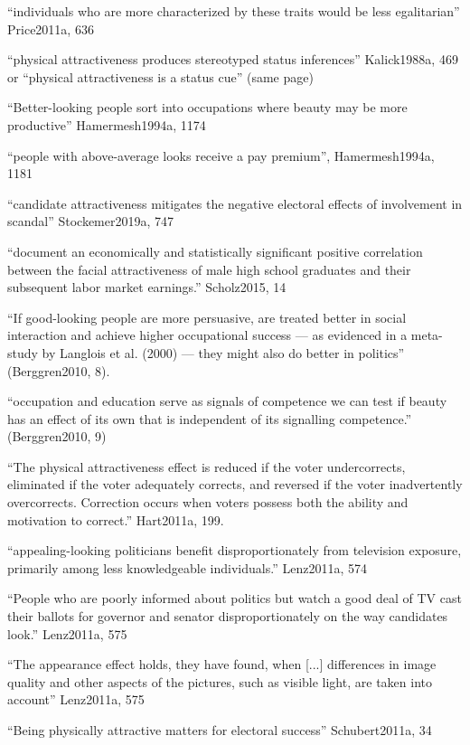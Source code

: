 ``individuals who are more characterized by these traits would be less egalitarian'' Price2011a, 636

``physical attractiveness produces stereotyped status inferences'' Kalick1988a, 469 or ``physical attractiveness is a status cue'' (same page)

``Better-looking people sort into occupations where beauty may be more productive'' Hamermesh1994a, 1174


		``people with above-average looks receive a pay premium'', Hamermesh1994a, 1181

		``candidate attractiveness mitigates the negative electoral effects of involvement in scandal'' Stockemer2019a, 747

``document an economically and statistically significant positive correlation between the facial attractiveness of male high school graduates and their subsequent labor market earnings.'' Scholz2015, 14

``If good-looking people are more persuasive, are treated better in social interaction and achieve higher occupational success — as evidenced in a meta-study by Langlois et al. (2000) — they might also do better in politics'' (Berggren2010, 8).

``occupation and education serve as signals of competence we can test if beauty has an effect of its own that is independent of its signalling competence.'' (Berggren2010, 9)

``The physical attractiveness effect is reduced if the voter undercorrects, eliminated if the voter adequately corrects, and reversed if the voter inadvertently overcorrects. Correction occurs when voters possess both the ability and motivation to correct.'' Hart2011a, 199.

``appealing-looking politicians benefit disproportionately from television exposure, primarily among less knowledgeable individuals.'' Lenz2011a, 574

``People who are poorly informed about politics but watch a good deal of TV cast their ballots for governor and senator disproportionately on the way candidates look.'' Lenz2011a, 575

``The appearance effect holds, they have found, when [...] differences in image quality and other aspects of the pictures, such as visible light, are taken into account'' Lenz2011a, 575

``Being physically attractive matters for electoral success'' Schubert2011a, 34

